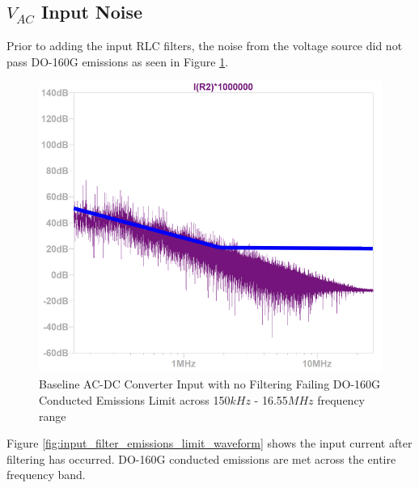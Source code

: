 \documentclass[conference]{IEEEtran}
\begin{document}
\subsection{$V_{AC}$ Input Noise}
Prior to adding the input RLC filters, the noise from the voltage source did not pass DO-160G emissions as seen in Figure \ref{fig:no_input_filter_top_level_waveform}. 

\begin{figure}[htp]
    \centering
    \includegraphics[width=1.0\linewidth]{no_input_filter_emissions_limit.png}
    \caption{Baseline AC-DC Converter Input with no Filtering Failing DO-160G Conducted Emissions Limit across 150$kHz$ - 16.55$MHz$ frequency range}
    \label{fig:no_input_filter_top_level_waveform}
\end{figure}

Figure \ref{fig:input_filter_emissions_limit_waveform} shows the input current after filtering has occurred. DO-160G conducted emissions are met across the entire frequency band.
\end{document}
